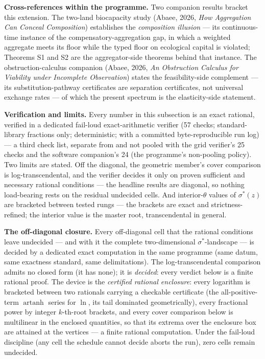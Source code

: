 \documentclass[3p,11pt]{elsarticle}
\begin{document}
\textbf{Cross-references within the programme.} Two companion results
bracket this extension. The two-land biocapacity study (Abaee, 2026,
\emph{How Aggregation Can Conceal Composition}) establishes the
\emph{composition illusion} --- its continuous-time instance of the
compensatory-aggregation gap, in which a weighted aggregate meets its
floor while the typed floor on ecological capital is violated; Theorems S1
and S2 are the aggregator-side theorems behind that instance. The
obstruction-calculus companion (Abaee, 2026, \emph{An Obstruction
Calculus for Viability under Incomplete Observation}) states the
feasibility-side complement --- its substitution-pathway certificates are
separation certificates, not universal exchange rates --- of which the
present spectrum is the elasticity-side statement.

\textbf{Verification and limits.} Every number in this subsection
is an exact rational, verified in a dedicated fail-loud exact-arithmetic
verifier (57 checks; standard-library fractions only; deterministic; with
a committed byte-reproducible run log) --- a third check list, separate
from and not pooled with the grid verifier's 25 checks and the software
companion's 24 (the programme's non-pooling policy). Two limits are stated.
Off the diagonal, the geometric member's cover comparison is
log-transcendental, and the verifier decides it only on proven sufficient
and necessary rational conditions --- the headline results are diagonal,
so nothing load-bearing rests on the residual undecided cells. And
interior-\(\theta\) values of \(\sigma^*(z)\) are bracketed between
tested rungs --- the brackets are exact and strictness-refined; the
interior value is the master root, transcendental in general.

\textbf{The off-diagonal closure.} Every off-diagonal cell that
the rational conditions leave undecided --- and with it the
complete two-dimensional \(\sigma^*\)-landscape --- is decided by
a dedicated exact computation in the same programme (same datum,
same exactness standard, same delimitations).
The log-transcendental comparison admits no closed form (it has
none); it is \emph{decided}: every verdict below is a finite
rational proof. The device is the \emph{certified rational
enclosure}: every logarithm is bracketed between two rationals
carrying a checkable certificate (the all-positive-term
\(\operatorname{artanh}\) series for \(\ln\), its tail dominated
geometrically), every fractional power by integer \(k\)-th-root
brackets, and every cover comparison below is multilinear in the
enclosed quantities, so that its extrema over the enclosure box
are attained at the vertices --- a finite rational computation.
Under the fail-loud discipline (any cell the schedule cannot decide
aborts the run), zero cells remain undecided.
\end{document}
